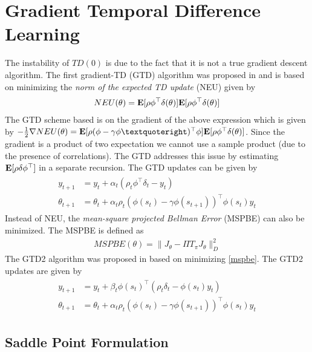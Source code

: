 \section{Gradient Temporal Difference Learning}
The instability of $TD(0)$ is due to the fact that it is not a true gradient descent algorithm. The first gradient-TD (GTD) algorithm was proposed in \cite{} and is based on minimizing the \emph{norm of the expected TD update} (NEU) given by
\begin{align}\label{neu}
NEU(\theta)=\mathbf{E}[\rho\phi^\top\delta(\theta)]\mathbf{E}[\rho\phi^\top\delta(\theta)]
\end{align}
The GTD scheme based is on the gradient of the above expression which is given by $-\frac{1}{2}\nabla NEU(\theta)=\E[\rho (\phi-\gamma\phi’)^\top \phi]\E[\rho \phi^\top\delta(\theta)]$. Since the gradient is a product of two expectation we cannot use a sample product (due to the presence of correlations). The GTD addresses this issue by estimating $\mathbf{E}[\rho\delta\phi^\top]$ in a separate recursion. The GTD updates can be given by
\begin{align}
\begin{split}
y_{t+1}&=y_t+\alpha_t(\rho_t\phi^\top\delta_t -y_t)\\
\theta_{t+1}&=\theta_t+\alpha_t\rho_t(\phi(s_t)-\gamma\phi(s_{t+1}))^\top\phi(s_t)y_t
\end{split}
\end{align}
Instead of NEU, the \emph{mean-square projected Bellman Error} (MSPBE) can also be minimized. The MSPBE is defined as
\begin{align}\label{mspbe}
MSPBE(\theta)=\parallel J_\theta-\Pi T_\pi J_\theta \parallel^2_D
\end{align}
The GTD2 algorithm was proposed in \cite{} based on minimizing \eqref{mspbe}. The GTD2 updates are given by
\begin{align}
\begin{split}
y_{t+1}&=y_t+\beta_t\phi(s_t)^\top(\rho_t\delta_t-\phi(s_t)y_t)\\
\theta_{t+1}&=\theta_t+\alpha_t\rho_t(\phi(s_t)-\gamma\phi(s_{t+1}))^\top\phi(s_t)y_t
\end{split}
\end{align}
\subsection{Saddle Point Formulation}

